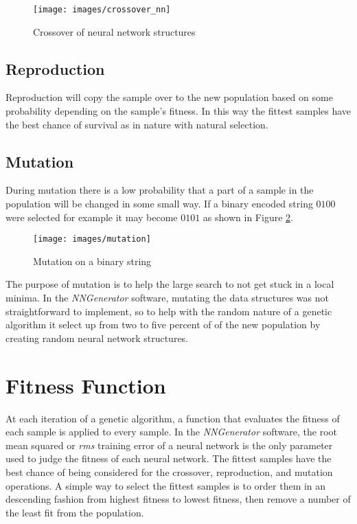 \begin{figure}[h!]
  \centering
  \texttt{[image: images/crossover\_nn]}
  \caption{Crossover of neural network structures}
  \label{crossover_nn}
\end{figure}

\subsection{Reproduction}
Reproduction will copy the sample over to the new population based on some probability depending on the sample's fitness. 
In this way the fittest samples have the best chance of survival as in nature with natural selection.

\subsection{Mutation}
During mutation there is a low probability that a part of a sample in the population will be changed in some small way. 
If a binary encoded string $0100$ were selected for example it may become $0101$ as shown in Figure \ref{mutation}.

\begin{figure}[h!]
  \centering
  \texttt{[image: images/mutation]}
  \caption{Mutation on a binary string}
  \label{mutation}
\end{figure}

The purpose of mutation is to help the large search to not get stuck
in a local minima.
In the {\it NNGenerator} software, mutating the data structures was not
straightforward to implement, so to help with the random nature of a
genetic algorithm it select up from two to five percent of of the new
population by creating random neural network structures.


\section{Fitness Function}
At each iteration of a genetic algorithm, a function that evaluates the fitness of each sample is applied to every sample.
In the {\it NNGenerator} software, the root mean squared or {\it rms}
training error of a neural network is the only parameter used to
judge the fitness of each neural network.
The fittest samples have the best chance of being considered for the crossover, reproduction, and mutation operations.
A simple way to select the fittest samples is to order them in an descending fashion from highest fitness to lowest fitness, then remove a number of the least fit from the population.

